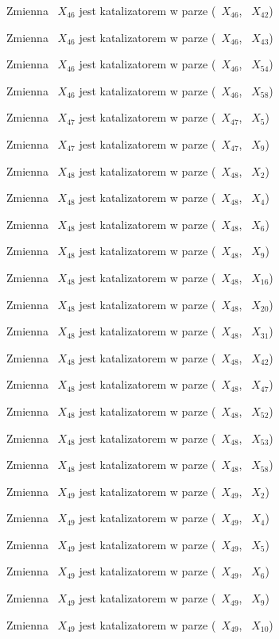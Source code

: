 \documentclass{article}
\begin{document}
Zmienna ~$X_{46}$ jest katalizatorem w parze (~$X_{46}$, ~$X_{42}$)

Zmienna ~$X_{46}$ jest katalizatorem w parze (~$X_{46}$, ~$X_{43}$)

Zmienna ~$X_{46}$ jest katalizatorem w parze (~$X_{46}$, ~$X_{54}$)

Zmienna ~$X_{46}$ jest katalizatorem w parze (~$X_{46}$, ~$X_{58}$)

Zmienna ~$X_{47}$ jest katalizatorem w parze (~$X_{47}$, ~$X_{5}$)

Zmienna ~$X_{47}$ jest katalizatorem w parze (~$X_{47}$, ~$X_{9}$)

Zmienna ~$X_{48}$ jest katalizatorem w parze (~$X_{48}$, ~$X_{2}$)

Zmienna ~$X_{48}$ jest katalizatorem w parze (~$X_{48}$, ~$X_{4}$)

Zmienna ~$X_{48}$ jest katalizatorem w parze (~$X_{48}$, ~$X_{6}$)

Zmienna ~$X_{48}$ jest katalizatorem w parze (~$X_{48}$, ~$X_{9}$)

Zmienna ~$X_{48}$ jest katalizatorem w parze (~$X_{48}$, ~$X_{16}$)

Zmienna ~$X_{48}$ jest katalizatorem w parze (~$X_{48}$, ~$X_{20}$)

Zmienna ~$X_{48}$ jest katalizatorem w parze (~$X_{48}$, ~$X_{31}$)

Zmienna ~$X_{48}$ jest katalizatorem w parze (~$X_{48}$, ~$X_{42}$)

Zmienna ~$X_{48}$ jest katalizatorem w parze (~$X_{48}$, ~$X_{47}$)

Zmienna ~$X_{48}$ jest katalizatorem w parze (~$X_{48}$, ~$X_{52}$)

Zmienna ~$X_{48}$ jest katalizatorem w parze (~$X_{48}$, ~$X_{53}$)

Zmienna ~$X_{48}$ jest katalizatorem w parze (~$X_{48}$, ~$X_{58}$)

Zmienna ~$X_{49}$ jest katalizatorem w parze (~$X_{49}$, ~$X_{2}$)

Zmienna ~$X_{49}$ jest katalizatorem w parze (~$X_{49}$, ~$X_{4}$)

Zmienna ~$X_{49}$ jest katalizatorem w parze (~$X_{49}$, ~$X_{5}$)

Zmienna ~$X_{49}$ jest katalizatorem w parze (~$X_{49}$, ~$X_{6}$)

Zmienna ~$X_{49}$ jest katalizatorem w parze (~$X_{49}$, ~$X_{9}$)

Zmienna ~$X_{49}$ jest katalizatorem w parze (~$X_{49}$, ~$X_{10}$)
\end{document}
